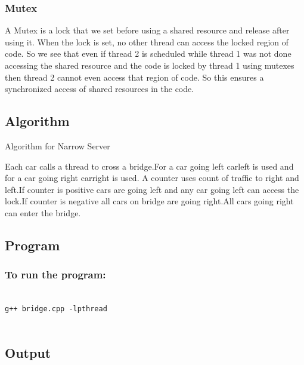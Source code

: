 \documentclass{article}
\begin{document}
\subsubsection{Mutex}

    A Mutex is a lock that we set before using a shared resource and release after using it.
    When the lock is set, no other thread can access the locked region of code.
    So we see that even if thread 2 is scheduled while thread 1 was not done accessing the shared resource and the code is locked by thread 1 using mutexes then thread 2 cannot even access that region of code.
    So this ensures a synchronized access of shared resources in the code.

  \subsection{Algorithm}
  \begin{algorithm}[H]
  
  \caption{Algorithm for Narrow Server}
  \end{algorithm}
  
  Each car calls a thread to cross a bridge.For a car going left carleft is used and for a car going right carright is used. A counter uses count of traffic to right and left.If counter is positive cars are going left and any car going left can access the lock.If counter is negative all cars on bridge are going right.All cars going right can enter the bridge.

  \subsection{Program}
  
  \newpage
  \subsubsection{To run the program:}
   \begin{verbatim}

g++ bridge.cpp -lpthread


  \end{verbatim}
  
  \subsection{Output}
\end{document}
